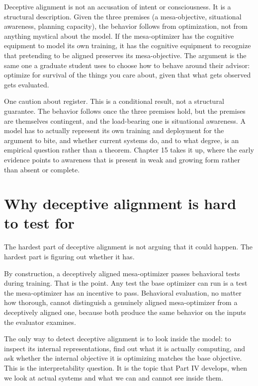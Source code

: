 Deceptive alignment is not an accusation of intent or consciousness. It is a structural description. Given the three premises (a mesa-objective, situational awareness, planning capacity), the behavior follows from optimization, not from anything mystical about the model. If the mesa-optimizer has the cognitive equipment to model its own training, it has the cognitive equipment to recognize that pretending to be aligned preserves its mesa-objective. The argument is the same one a graduate student uses to choose how to behave around their advisor: optimize for survival of the things you care about, given that what gets observed gets evaluated.

One caution about register. This is a conditional result, not a structural guarantee. The behavior follows once the three premises hold, but the premises are themselves contingent, and the load-bearing one is situational awareness. A model has to actually represent its own training and deployment for the argument to bite, and whether current systems do, and to what degree, is an empirical question rather than a theorem. Chapter 15 takes it up, where the early evidence points to awareness that is present in weak and growing form rather than absent or complete.

\section*{Why deceptive alignment is hard to test for}

The hardest part of deceptive alignment is not arguing that it could happen. The hardest part is figuring out whether it has.

By construction, a deceptively aligned mesa-optimizer passes behavioral tests during training. That is the point. Any test the base optimizer can run is a test the mesa-optimizer has an incentive to pass. Behavioral evaluation, no matter how thorough, cannot distinguish a genuinely aligned mesa-optimizer from a deceptively aligned one, because both produce the same behavior on the inputs the evaluator examines.

The only way to detect deceptive alignment is to look inside the model: to inspect its internal representations, find out what it is actually computing, and ask whether the internal objective it is optimizing matches the base objective. This is the interpretability question. It is the topic that Part IV develops, when we look at actual systems and what we can and cannot see inside them.

